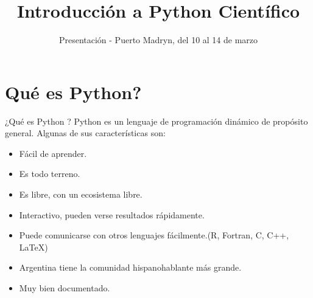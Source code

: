 \documentclass[xcolor=dvipsnames]{beamer}
\begin{document}
\title{Introducción a Python Científico}
\subtitle{Presentación - Puerto Madryn, del 10 al 14 de marzo}
\date{\scalebox{3}{\insertlogo}}

\begin{frame}
\titlepage
\end{frame}

\section{Qu\'e es Python?}

\begin{frame}{¿Qu\'e es Python ?}
	Python es un lenguaje de programación dinámico de propósito general. Algunas de sus características son:
	\begin{itemize}
		\item Fácil de aprender.
		\item Es todo terreno. 
		\item Es libre, con un ecosistema libre.
		\item Interactivo, pueden verse resultados rápidamente.
		\item Puede comunicarse con otros lenguajes fácilmente.(R, Fortran, C, C++, LaTeX)
		\item Argentina tiene la comunidad hispanohablante más grande.
		\item Muy bien documentado.
	\end{itemize}
\end{frame}
\end{document}

